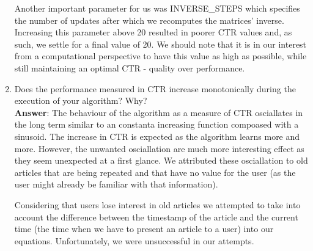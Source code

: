 \documentclass[11pt]{article}
\begin{document}
\begin{enumerate}
Another important parameter for us was INVERSE\_STEPS which specifies the
number of updates after which we recomputes the matrices' inverse. Increasing
this parameter above 20 resulted in poorer CTR values and, as such, we settle
for a final value of 20. We should note that it is in our interest from a
 computational perspective to have this value as high as possible, while still
 maintaining an optimal CTR - quality over performance.

\item Does the performance measured in CTR increase monotonically during the
execution of your algorithm? Why? \\
\textbf{Answer}:
The behaviour of the algorithm as a measure of CTR osciallates in the long term
similar to an constanta increasing function compoased with a sinusoid. The
increase in CTR is expected as the algorithm learns more and more. However, the
unwanted osciallation are much more interesting effect as they seem unexpected
at a first glance. We attributed these osciallation to old articles that are
being repeated and that have no value for the user (as the user might already
be familiar with that information).

Considering that users lose interest in old articles we attempted to take into
account the difference between the timestamp of the article and the current
time (the time when we have to present an article to a user) into our equations.
Unfortunately, we were unsuccessful in our attempts.

\end{enumerate}
\end{document}
